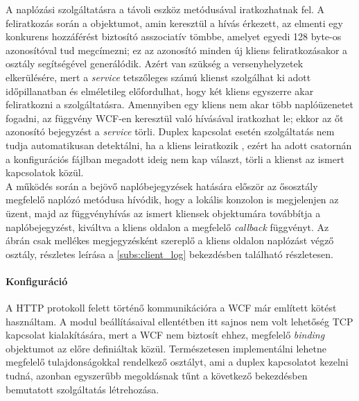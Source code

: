 A naplózási szolgáltatásra a távoli eszköz  metódusával iratkozhatnak fel. A feliratkozás során a  objektumot, amin keresztül a hívás érkezett, az  elmenti egy konkurens hozzáférést biztosító asszociatív tömbbe, amelyet egyedi 128 byte-os azonosítóval tud megcímezni; ez az azonosító minden új kliens feliratkozásakor a  osztály segítségével generálódik. Azért van szükség a versenyhelyzetek elkerülésére, mert a \emph{service} tetszőleges számú klienst szolgálhat ki adott időpillanatban és elméletileg előfordulhat, hogy két kliens egyszerre akar feliratkozni a szolgáltatásra. Amennyiben egy kliens nem akar több naplóüzenetet fogadni, az  függvény WCF-en keresztül való hívásával iratkozhat le; ekkor az őt azonosító bejegyzést a \emph{service} törli. Duplex kapcsolat esetén szolgáltatás nem tudja automatikusan detektálni, ha a kliens leiratkozik \cite{wcf-doc}, ezért ha adott csatornán a konfigurációs fájlban megadott ideig nem kap választ, törli a klienst az ismert kapcsolatok közül.\\
A működés során a bejövő naplóbejegyzések hatására először az ősosztály megfelelő naplózó metódusa hívódik, hogy a lokális konzolon is megjelenjen az üzent, majd az  függvényhívás az ismert kliensek  objektumára továbbítja a naplóbejegyzést, kiváltva a kliens oldalon a megfelelő \emph{callback} függvényt. Az ábrán csak mellékes megjegyzésként szereplő  a kliens oldalon naplózást végző osztály, részletes leírása a \ref{subs:client_log} bekezdésben található részletesen.

\paragraph{Konfiguráció} A HTTP protokoll felett történő kommunikációra a WCF már említett  kötést használtam. A  modul beállításaival ellentétben itt sajnos nem volt lehetőség TCP kapcsolat kialakítására, mert a WCF nem biztosít ehhez, megfelelő \emph{binding} objektumot az előre definiáltak közül. Természetesen implementálni lehetne megfelelő tulajdonságokkal rendelkező osztályt, ami a duplex kapcsolatot kezelni tudná, azonban egyszerűbb megoldásnak tűnt a következő bekezdésben bemutatott szolgáltatás létrehozása.

\subsection{}
